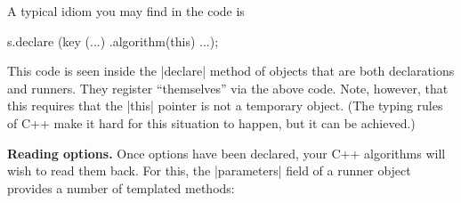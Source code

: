 A typical idiom you may find in the code is
%
\begin{codeexample}[code only, tikz syntax=false]
s.declare (key (...)
           .algorithm(this)
           ...);
\end{codeexample}
%
This code is seen inside the |declare| method of objects that are both
declarations and runners. They register ``themselves'' via the above code.
Note, however, that this requires that the |this| pointer is not a temporary
object. (The typing rules of C++ make it hard for this situation to happen, but
it can be achieved.)


\medskip
\noindent\textbf{Reading options.} Once options have been declared, your C++
algorithms will wish to read them back. For this, the |parameters| field of a
runner object provides a number of templated  methods:
%
